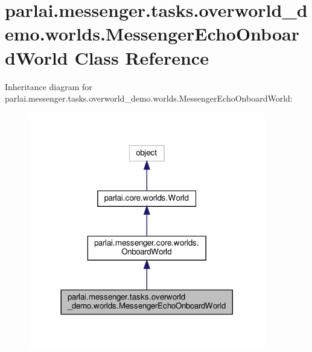 \hypertarget{classparlai_1_1messenger_1_1tasks_1_1overworld__demo_1_1worlds_1_1MessengerEchoOnboardWorld}{}\section{parlai.\+messenger.\+tasks.\+overworld\+\_\+demo.\+worlds.\+Messenger\+Echo\+Onboard\+World Class Reference}
\label{classparlai_1_1messenger_1_1tasks_1_1overworld__demo_1_1worlds_1_1MessengerEchoOnboardWorld}


Inheritance diagram for parlai.\+messenger.\+tasks.\+overworld\+\_\+demo.\+worlds.\+Messenger\+Echo\+Onboard\+World\+:
\nopagebreak
\begin{figure}[H]
\begin{center}
\leavevmode
\includegraphics[width=293pt]{classparlai_1_1messenger_1_1tasks_1_1overworld__demo_1_1worlds_1_1MessengerEchoOnboardWorld__inherit__graph}
\end{center}
\end{figure}


